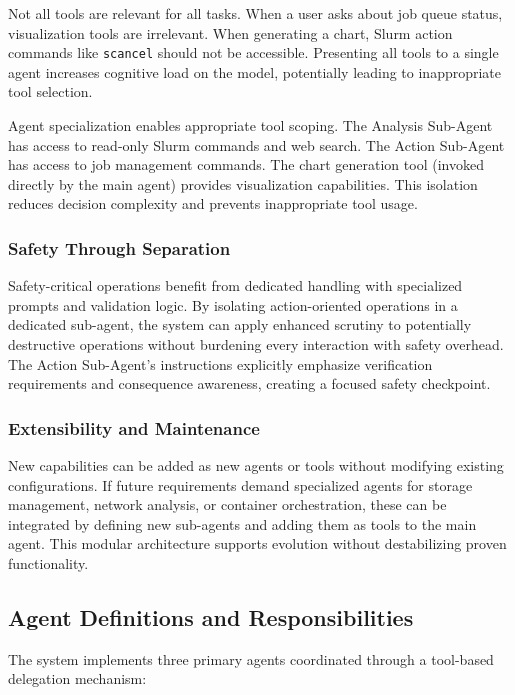 Not all tools are relevant for all tasks. When a user asks about job queue status, visualization tools are irrelevant. When generating a chart, Slurm action commands like \texttt{scancel} should not be accessible. Presenting all tools to a single agent increases cognitive load on the model, potentially leading to inappropriate tool selection.

Agent specialization enables appropriate tool scoping. The Analysis Sub-Agent has access to read-only Slurm commands and web search. The Action Sub-Agent has access to job management commands. The chart generation tool (invoked directly by the main agent) provides visualization capabilities. This isolation reduces decision complexity and prevents inappropriate tool usage.

\subsubsection{Safety Through Separation}

Safety-critical operations benefit from dedicated handling with specialized prompts and validation logic. By isolating action-oriented operations in a dedicated sub-agent, the system can apply enhanced scrutiny to potentially destructive operations without burdening every interaction with safety overhead. The Action Sub-Agent's instructions explicitly emphasize verification requirements and consequence awareness, creating a focused safety checkpoint.

\subsubsection{Extensibility and Maintenance}

New capabilities can be added as new agents or tools without modifying existing configurations. If future requirements demand specialized agents for storage management, network analysis, or container orchestration, these can be integrated by defining new sub-agents and adding them as tools to the main agent. This modular architecture supports evolution without destabilizing proven functionality.

\subsection{Agent Definitions and Responsibilities}

The system implements three primary agents coordinated through a tool-based delegation mechanism:

